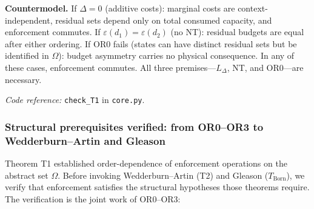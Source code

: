 \documentclass[11pt]{article}
\newcommand{\coderef}[2]{\smallskip\noindent\textit{Code reference:} \texttt{#1} in \texttt{#2}.}
\begin{document}
\begin{tcolorbox}[apfbox, title={Theorem T1 --- The Bridge Theorem (Order-Dependence)}]
\smallskip\noindent\textbf{Countermodel.}  If $\Delta = 0$ (additive costs): marginal costs are context-independent, residual sets depend only on total consumed capacity, and enforcement commutes.  If $\varepsilon(d_1) = \varepsilon(d_2)$ (no NT): residual budgets are equal after either ordering.  If OR0 fails (states can have distinct residual sets but be identified in $\Omega$): budget asymmetry carries no physical consequence.  In any of these cases, enforcement commutes.  All three premises---$L_\Delta$, NT, and OR0---are necessary.

\coderef{check\_T1}{core.py}
\end{tcolorbox}


\subsubsection*{Structural prerequisites verified: from OR0--OR3 to Wedderburn--Artin and Gleason}

Theorem T1 established order-dependence of enforcement operations on the abstract set $\Omega$.  Before invoking Wedderburn--Artin (T2) and Gleason ($T_{\mathrm{Born}}$), we verify that enforcement satisfies the structural hypotheses those theorems require.  The verification is the joint work of OR0--OR3:
\end{document}
